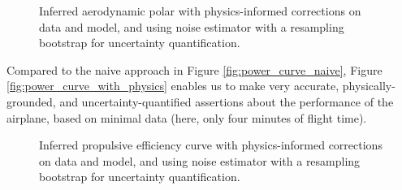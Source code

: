 \begin{figure}[!htb]
    \centering
    \caption{Inferred aerodynamic polar with physics-informed corrections on data and model, and using noise estimator with a resampling bootstrap for uncertainty quantification.}
    \label{fig:aerodynamic_polar_with_physics}
\end{figure}

Compared to the naive approach in Figure \ref{fig:power_curve_naive}, Figure \ref{fig:power_curve_with_physics} enables us to make very accurate, physically-grounded, and uncertainty-quantified assertions about the performance of the airplane, based on minimal data (here, only four minutes of flight time).

\begin{figure}[!htb]
    \centering
    \caption{Inferred propulsive efficiency curve with physics-informed corrections on data and model, and using noise estimator with a resampling bootstrap for uncertainty quantification.}
    \label{fig:propeller_polar_with_physics}
\end{figure}


